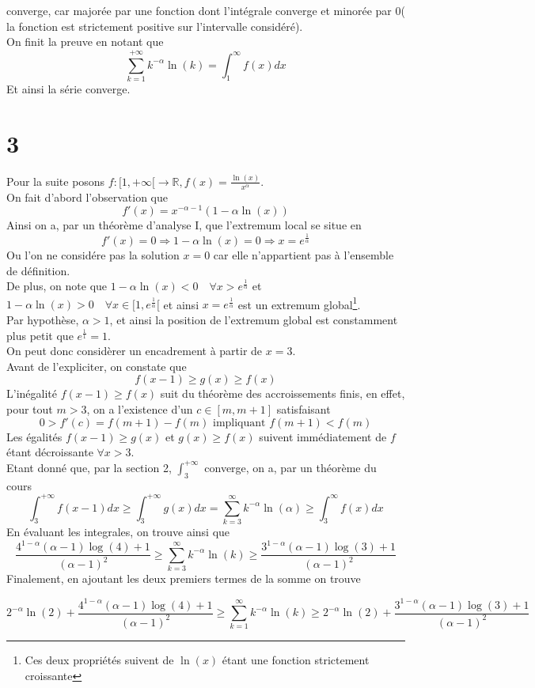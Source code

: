 \documentclass[11pt, a4paper, twoside]{article}
\begin{document}
converge, car majorée par une fonction dont l'intégrale converge et minorée par 0( la fonction est strictement positive sur l'intervalle considéré). \\
On finit la preuve en notant que
\[ 
	\sum_{k=1}^{ + \infty } k^{-\alpha}\ln( k) = \int_{ 1 }^{ \infty  }f( x) dx
\]
Et ainsi la série converge.
\section*{3}
Pour la suite posons $f: [ 1, + \infty[ \to \mathbb{R},f(x) = \frac{\ln( x) }{x^{\alpha}}$.\\
On fait d'abord l'observation que 
\[ 
	f'( x) = x^{-\alpha-1}\left( 1- \alpha \ln( x) \right) 
\]
Ainsi on a, par un théorème d'analyse I, que l'extremum local se situe en 
\[ 
	f'( x) =0 \Rightarrow 	1 - \alpha \ln( x) = 0 \Rightarrow x = e^{\frac{1}{\alpha}} 
\]
Ou l'on ne considére pas la solution $x=0$ car elle n'appartient pas à l'ensemble de définition.\\
De plus, on note que $1-\alpha \ln( x) <0 \quad \forall x> e^{\frac{1}{\alpha}}$ et $1-\alpha \ln( x) >0 \quad \forall x \in [ 1, e^{\frac{1}{\alpha}}[ $ et ainsi $x= e^{\frac{1}{\alpha}}$ est un extremum global\footnote{Ces deux propriétés suivent de $\ln( x) $ étant une fonction strictement croissante}.\\
Par hypothèse, $\alpha>1$, et ainsi la position de l'extremum global est constamment plus petit que $e^{\frac{1}{1}}=1$.\\
On peut donc considèrer un encadrement à partir de $x=3$.\\
Avant de l'expliciter, on constate que
\[ 
	f( x-1) \geq g( x) \geq f(x) 
\]
L'inégalité $f( x-1) \geq f( x) $ suit du théorème des accroissements finis, en effet, pour tout $m>3$, on a l'existence d'un $c \in [m,m+1]$ satisfaisant
\[ 
	0 > f'( c)  = f( m+1) -f( m) \text{ impliquant } f( m+1) < f( m) 
\]
Les égalités $f( x-1) \geq g( x)$ et $g( x) \geq f( x) $ suivent immédiatement de $f$ étant décroissante $\forall x> 3$.\\

Etant donné que, par la section 2, $ \int_{ 3 }^{ + \infty  }$ converge, on a, par un théorème du cours
\[ 
	\int_{ 3 }^{ + \infty  } f( x-1) dx \geq \int_{ 3 }^{ + \infty  }g( x) dx = \sum_{k=3}^{ \infty } k^{-\alpha} \ln( \alpha) \geq \int_{ 3 }^{ \infty  }f( x) dx
\]
En évaluant les integrales, on trouve ainsi que
\[ 
	\frac{4^{1-\alpha}( \alpha-1) \log( 4) +1}{( \alpha-1) ^{2}} \geq\sum_{k=3}^{ \infty } k^{-\alpha} \ln( k)\geq \frac{3^{1-\alpha}( \alpha-1) \log( 3) +1}{( \alpha-1) ^{2}} 
\]
Finalement, en ajoutant les deux premiers termes de la somme on trouve

\[ 
	2^{-\alpha}\ln( 2) + \frac{4^{1-\alpha}( \alpha-1) \log( 4) +1}{( \alpha-1) ^{2}} \geq\sum_{k=1}^{ \infty } k^{-\alpha} \ln( k)\geq 2^{-\alpha}\ln( 2) +\frac{3^{1-\alpha}( \alpha-1) \log( 3) +1}{( \alpha-1) ^{2}} 
\]
\end{document}
